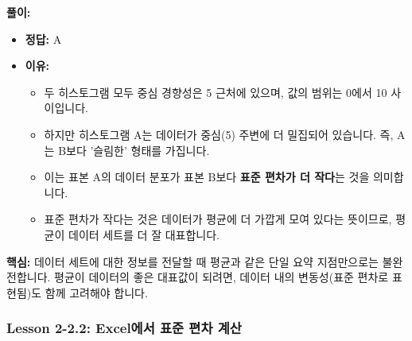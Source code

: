 \documentclass[11pt,a4paper]{article}
\theoremstyle{definition}
\begin{document}
\begin{examplebox}[title=연습 문제: 히스토그램을 통한 평균의 대표성 판단]
\textbf{풀이:}
\begin{itemize}
    \item \textbf{정답:} A
    \item \textbf{이유:}
    \begin{itemize}
        \item 두 히스토그램 모두 중심 경향성은 5 근처에 있으며, 값의 범위는 0에서 10 사이입니다.
        \item 하지만 히스토그램 A는 데이터가 중심(5) 주변에 더 밀집되어 있습니다. 즉, A는 B보다 '슬림한' 형태를 가집니다.
        \item 이는 표본 A의 데이터 분포가 표본 B보다 \textbf{표준 편차가 더 작다}는 것을 의미합니다.
        \item 표준 편차가 작다는 것은 데이터가 평균에 더 가깝게 모여 있다는 뜻이므로, 평균이 데이터 세트를 더 잘 대표합니다.
    \end{itemize}
\end{itemize}
\textbf{핵심:} 데이터 세트에 대한 정보를 전달할 때 평균과 같은 단일 요약 지점만으로는 불완전합니다. 평균이 데이터의 좋은 대표값이 되려면, 데이터 내의 변동성(표준 편차로 표현됨)도 함께 고려해야 합니다.
\end{examplebox}

\newpage
\subsubsection*{Lesson 2-2.2: Excel에서 표준 편차 계산}
\end{document}

